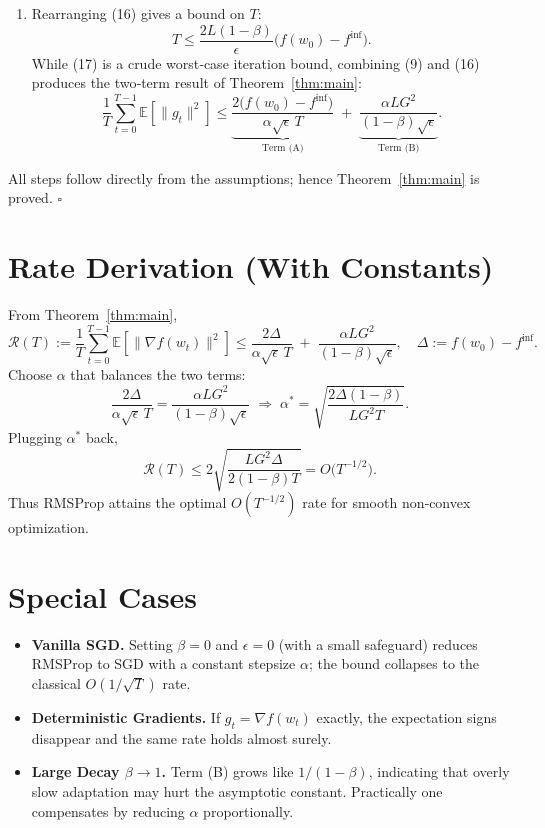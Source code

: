 \documentclass[11pt]{article}
\begin{document}
\begin{enumerate}
\item[Step 18.] Rearranging (16) gives a bound on $T$:
\[
T \le \frac{2L(1-\beta)}{\epsilon}\bigl(f(w_0)-f^{\inf}\bigr).
\tag{17}
\]
While (17) is a crude worst‑case iteration bound, combining (9) and (16)
produces the two‑term result of Theorem~\ref{thm:main}:
\[
\frac{1}{T}\sum_{t=0}^{T-1}\mathbb{E}[\|g_t\|^{2}]
\le
\underbrace{\frac{2\bigl(f(w_0)-f^{\inf}\bigr)}{\alpha\sqrt{\epsilon}\,T}}_{\text{Term (A)}}
\;+\;
\underbrace{\frac{\alpha L G^{2}}{(1-\beta)\sqrt{\epsilon}}}_{\text{Term (B)}} .
\]
\end{enumerate}
All steps follow directly from the assumptions; hence Theorem~\ref{thm:main}
is proved. $\square$

\section*{Rate Derivation (With Constants)}
From Theorem~\ref{thm:main},
\[
\mathcal{R}(T):=
\frac{1}{T}\sum_{t=0}^{T-1}
\mathbb{E}[\|\nabla f(w_t)\|^{2}]
\le
\frac{2\Delta}{\alpha\sqrt{\epsilon}\,T}
\;+\;
\frac{\alpha L G^{2}}{(1-\beta)\sqrt{\epsilon}},
\quad\Delta:=f(w_0)-f^{\inf}.
\]
Choose $\alpha$ that balances the two terms:
\[
\frac{2\Delta}{\alpha\sqrt{\epsilon}\,T}
=
\frac{\alpha L G^{2}}{(1-\beta)\sqrt{\epsilon}}
\;\Longrightarrow\;
\alpha^{*}
= \sqrt{\frac{2\Delta(1-\beta)}{L G^{2} T}} .
\]
Plugging $\alpha^{*}$ back,
\[
\mathcal{R}(T)
\le
2\sqrt{\frac{L G^{2}\Delta}{2(1-\beta)T}}
=
O\!\bigl(T^{-1/2}\bigr).
\]
Thus RMSProp attains the optimal $O(T^{-1/2})$ rate for smooth non‑convex
optimization.

\section*{Special Cases}
\begin{itemize}[leftmargin=*]
\item \textbf{Vanilla SGD.} Setting $\beta=0$ and $\epsilon=0$ (with a small
  safeguard) reduces RMSProp to SGD with a constant stepsize $\alpha$; the
  bound collapses to the classical $O(1/\sqrt{T})$ rate.
\item \textbf{Deterministic Gradients.} If $g_t=\nabla f(w_t)$ exactly,
  the expectation signs disappear and the same rate holds almost surely.
\item \textbf{Large Decay $\beta\to 1$.} Term (B) grows like $1/(1-\beta)$,
  indicating that overly slow adaptation may hurt the asymptotic constant.
  Practically one compensates by reducing $\alpha$ proportionally.
\end{itemize}
\end{document}

